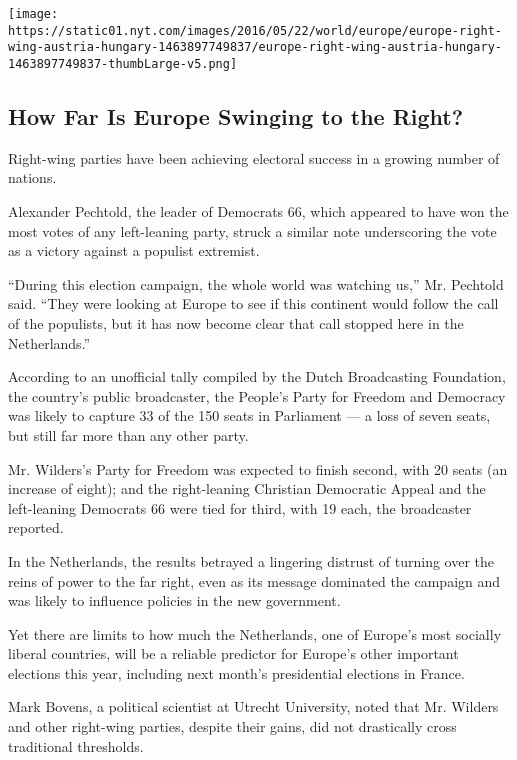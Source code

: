 \href{https://www.nytimes.com/interactive/2016/05/22/world/europe/europe-right-wing-austria-hungary.html}{}

\texttt{[image: https://static01.nyt.com/images/2016/05/22/world/europe/europe-right-wing-austria-hungary-1463897749837/europe-right-wing-austria-hungary-1463897749837-thumbLarge-v5.png]}

\hypertarget{how-far-is-europe-swinging-to-the-right}{%
\subsection{How Far Is Europe Swinging to the
Right?}\label{how-far-is-europe-swinging-to-the-right}}

Right-wing parties have been achieving electoral success in a growing
number of nations.

Alexander Pechtold, the leader of Democrats 66, which appeared to have
won the most votes of any left-leaning party, struck a similar note
underscoring the vote as a victory against a populist extremist.

``During this election campaign, the whole world was watching us,'' Mr.
Pechtold said. ``They were looking at Europe to see if this continent
would follow the call of the populists, but it has now become clear that
call stopped here in the Netherlands.''

According to an unofficial tally compiled by the Dutch Broadcasting
Foundation, the country's public broadcaster, the People's Party for
Freedom and Democracy was likely to capture 33 of the 150 seats in
Parliament --- a loss of seven seats, but still far more than any other
party.

Mr. Wilders's Party for Freedom was expected to finish second, with 20
seats (an increase of eight); and the right-leaning Christian Democratic
Appeal and the left-leaning Democrats 66 were tied for third, with 19
each, the broadcaster reported.

In the Netherlands, the results betrayed a lingering distrust of turning
over the reins of power to the far right, even as its message dominated
the campaign and was likely to influence policies in the new government.

Yet there are limits to how much the Netherlands, one of Europe's most
socially liberal countries, will be a reliable predictor for Europe's
other important elections this year, including next month's presidential
elections in France.

Mark Bovens, a political scientist at Utrecht University, noted that Mr.
Wilders and other right-wing parties, despite their gains, did not
drastically cross traditional thresholds.


